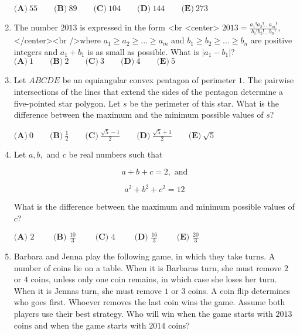 \documentclass{article}
\begin{document}
\begin{enumerate}[label=\arabic*., itemsep=0.5em]
$\textbf{(A)}\ 55 \qquad \textbf{(B)}\ 89 \qquad \textbf{(C)}\ 104 \qquad \textbf{(D)}\ 144 \qquad \textbf{(E)}\ 273$\par \vspace{0.5em}\item The number $2013$ is expressed in the form <br \> <center> $2013 = \frac {a_1!a_2!...a_m!}{b_1!b_2!...b_n!}$,</center><br />where $a_1 \ge a_2 \ge ... \ge a_m$ and $b_1 \ge b_2 \ge ... \ge b_n$ are positive integers and $a_1 + b_1$ is as small as possible. What is $|a_1 - b_1|$?
$\textbf{(A)}\ 1 \qquad \textbf{(B)}\ 2 \qquad \textbf{(C)}\ 3 \qquad \textbf{(D)}\ 4 \qquad \textbf{(E)}\ 5$\par \vspace{0.5em}\item Let $ABCDE$ be an equiangular convex pentagon of perimeter $1$. The pairwise intersections of the lines that extend the sides of the pentagon determine a five-pointed star polygon. Let $s$ be the perimeter of this star. What is the difference between the maximum and the minimum possible values of $s$?

$\textbf{(A)}\ 0 \qquad \textbf{(B)}\ \frac{1}{2} \qquad \textbf{(C)}\ \frac{\sqrt{5}-1}{2} \qquad \textbf{(D)}\  \frac{\sqrt{5}+1}{2} \qquad \textbf{(E)}\ \sqrt{5}$\par \vspace{0.5em}\item Let $a,b,$ and $c$ be real numbers such that 


\begin{equation*}
a+b+c=2, \text{ and}
\end{equation*}


\begin{equation*}
a^2+b^2+c^2=12
\end{equation*}


What is the difference between the maximum and minimum possible values of $c$?

$ \textbf{(A) }2\qquad \textbf{ (B) }\frac{10}{3}\qquad \textbf{ (C) }4 \qquad \textbf{ (D) }\frac{16}{3}\qquad \textbf{ (E) }\frac{20}{3} $\par \vspace{0.5em}\item Barbara and Jenna play the following game, in which they take turns. A number of coins lie on a table. When it is Barbaras turn, she must remove $2$ or $4$ coins, unless only one coin remains, in which case she loses her turn. When it is Jennas turn, she must remove $1$ or $3$ coins. A coin flip determines who goes first. Whoever removes the last coin wins the game. Assume both players use their best strategy. Who will win when the game starts with $2013$ coins and when the game starts with $2014$ coins?


\end{enumerate}
\end{document}
